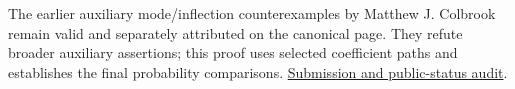 \documentclass[10pt,a4paper]{article}
\begin{document}
The earlier auxiliary mode/inflection counterexamples by Matthew J.
Colbrook remain valid and separately attributed on the canonical page.
They refute broader auxiliary assertions; this proof uses selected
coefficient paths and establishes the final probability comparisons.
\href{https://github.com/ajt60gaibb/OpenProblemsInNLA/blob/main/references/stepaniants-ra13-2026-09-11/README.md}{Submission
and public-status audit}.
\end{document}
